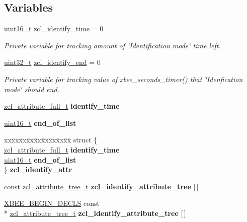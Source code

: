 \subsection*{Variables}
\begin{DoxyCompactItemize}
\item 
\hypertarget{group__zcl__identify_ga2cb1b23d3ccb08ae200e797358694d51}{\hyperlink{group__hal_ga5a8b2dc9e45a9ee81a94ef304fb62505}{uint16\-\_\-t} \hyperlink{group__zcl__identify_ga2cb1b23d3ccb08ae200e797358694d51}{zcl\-\_\-identify\-\_\-time} = 0}\label{group__zcl__identify_ga2cb1b23d3ccb08ae200e797358694d51}

\begin{DoxyCompactList}\small\item\em Private variable for tracking amount of \char`\"{}\-Identification mode\char`\"{} time left. \end{DoxyCompactList}\item 
\hyperlink{group__hal__dos_ga09a1e304d66d35dd47daffee9731edaa}{uint32\-\_\-t} \hyperlink{group__zcl__identify_ga467ad1e40ea8475b4e49865436883e94}{zcl\-\_\-identify\-\_\-end} = 0
\begin{DoxyCompactList}\small\item\em Private variable for tracking value of xbee\-\_\-seconds\-\_\-timer() that \char`\"{}\-Idenfication mode\char`\"{} should end. \end{DoxyCompactList}\item 
\hyperlink{structzcl__attribute__full__t}{zcl\-\_\-attribute\-\_\-full\-\_\-t} {\bfseries identify\-\_\-time}
\item 
\hyperlink{group__hal_ga5a8b2dc9e45a9ee81a94ef304fb62505}{uint16\-\_\-t} {\bfseries end\-\_\-of\-\_\-list}
\item 
\begin{tabbing}
xx\=xx\=xx\=xx\=xx\=xx\=xx\=xx\=xx\=\kill
struct \{\\
\>\hyperlink{structzcl__attribute__full__t}{zcl\_attribute\_full\_t} {\bfseries identify\_time}\\
\>\hyperlink{group__hal_ga5a8b2dc9e45a9ee81a94ef304fb62505}{uint16\_t} {\bfseries end\_of\_list}\\
\} {\bfseries zcl\_identify\_attr}\\

\end{tabbing}\item 
const \hyperlink{structzcl__attribute__tree__t}{zcl\-\_\-attribute\-\_\-tree\-\_\-t} {\bfseries zcl\-\_\-identify\-\_\-attribute\-\_\-tree} \mbox{[}$\,$\mbox{]}
\item 
\hypertarget{group__zcl__identify_ga8a328e26487840e24d43449775060b16}{\hyperlink{group__hal_ga336bff4f4a6012aacc4468132bbd3d7f}{X\-B\-E\-E\-\_\-\-B\-E\-G\-I\-N\-\_\-\-D\-E\-C\-L\-S} const \\*
\hyperlink{structzcl__attribute__tree__t}{zcl\-\_\-attribute\-\_\-tree\-\_\-t} {\bfseries zcl\-\_\-identify\-\_\-attribute\-\_\-tree} \mbox{[}$\,$\mbox{]}}\label{group__zcl__identify_ga8a328e26487840e24d43449775060b16}

\end{DoxyCompactItemize}


